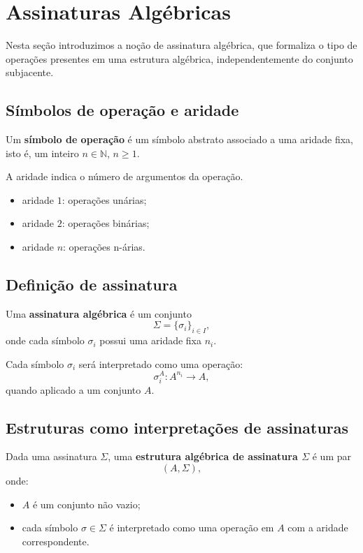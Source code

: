 \documentclass[../../main]{subfiles}
\begin{document}
\section{Assinaturas Algébricas}
\label{sec:matematica:algebra:estruturas-algebricas:assinaturas}

Nesta seção introduzimos a noção de assinatura algébrica, que formaliza o tipo de operações presentes em uma estrutura algébrica, independentemente do conjunto subjacente.

\subsection{Símbolos de operação e aridade}

Um \textbf{símbolo de operação} é um símbolo abstrato associado a uma aridade fixa, isto é, um inteiro $n \in \mathbb{N}$, $n \geq 1$.

A aridade indica o número de argumentos da operação.

\begin{itemize}
	\item aridade $1$: operações unárias;
	\item aridade $2$: operações binárias;
	\item aridade $n$: operações n-árias.
\end{itemize}

\subsection{Definição de assinatura}

Uma \textbf{assinatura algébrica} é um conjunto
\[
	\Sigma = \{\sigma_i\}_{i \in I},
\]
onde cada símbolo $\sigma_i$ possui uma aridade fixa $n_i$.

Cada símbolo $\sigma_i$ será interpretado como uma operação:
\[
	\sigma_i^A : A^{n_i} \to A,
\]
quando aplicado a um conjunto $A$.

\subsection{Estruturas como interpretações de assinaturas}

Dada uma assinatura $\Sigma$, uma \textbf{estrutura algébrica de assinatura $\Sigma$} é um par
\[
	(A, \Sigma),
\]
onde:

\begin{itemize}
	\item $A$ é um conjunto não vazio;
	\item cada símbolo $\sigma \in \Sigma$ é interpretado como uma operação em $A$ com a aridade correspondente.
\end{itemize}
\end{document}
